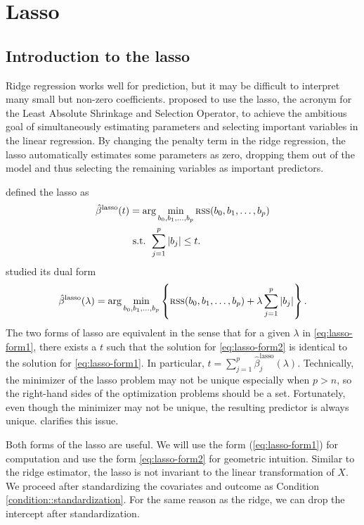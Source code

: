  
\chapter{Lasso}
 
\section{Introduction to the lasso}

Ridge regression works well for prediction, but it may be difficult
to interpret many small but non-zero coefficients. \citet{tibshirani1996regression} proposed to use the lasso, the acronym for the Least Absolute Shrinkage
and Selection Operator, to achieve the ambitious goal of simultaneously
estimating parameters and selecting important variables in the linear
regression. By changing the penalty term in the ridge regression,
the lasso automatically estimates some parameters as zero, dropping
them out of the model and thus selecting the remaining variables as
important predictors. 


\citet{tibshirani1996regression} defined the lasso as 
\begin{align}
\hat{\beta}^{\text{lasso}}(t) & =\arg\min_{b_{0},b_{1},\ldots,b_{p}}\textsc{rss}(b_0,b_1,\ldots,b_p)  \nonumber \\
 & \ \text{s.t. }\sum_{j=1}^{p}|b_{j}|\ensuremath{\leq t} .\label{eq:lasso-form2}
\end{align}
\citet{osborne2000lasso} studied its dual form
\begin{equation}
\hat{\beta}^{\text{lasso}}(\lambda)=\arg\min_{b_{0},b_{1},\ldots,b_{p}}\left\{\textsc{rss}(b_0,b_1,\ldots,b_p) +\lambda\sum_{j=1}^{p}|b_{j}|\right\} . \label{eq:lasso-form1}
\end{equation}
The two forms of lasso are equivalent in the sense that for a given $\lambda$ in \eqref{eq:lasso-form1}, there exists a $t$ such that the solution for \eqref{eq:lasso-form2} is identical to the solution for \eqref{eq:lasso-form1}. In particular, $t = \sum_{j=1}^p \hat{\beta}^{\text{lasso}}_j(\lambda) $. 
Technically, the minimizer of the lasso problem may not be unique especially when $p>n$, so the right-hand sides of the optimization problems should be a set. Fortunately, even though the minimizer may not be unique, the resulting predictor is always unique. \citet{tibshirani2013lasso} clarifies this issue.


Both forms of the lasso are useful. 
We will use the form (\ref{eq:lasso-form1}) for computation and use the form \eqref{eq:lasso-form2} for geometric intuition. Similar to the
ridge estimator, the lasso is not invariant to the linear transformation
of $X$. We proceed after standardizing the covariates and outcome as Condition \ref{condition::standardization}. For the same reason as the ridge, we can drop the intercept after standardization. 




